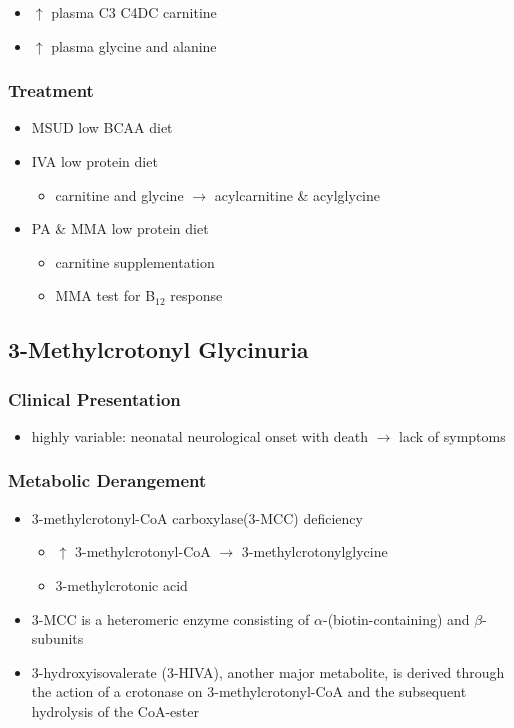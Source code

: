 \documentclass{scrartcl}
\begin{document}
\begin{enumerate}
\begin{itemize}
\item \(\uparrow\) plasma C3 \textpm{} C4DC carnitine
\item \(\uparrow\) plasma glycine and alanine
\end{itemize}
\end{enumerate}

\subsubsection{Treatment}
\label{sec:org5c84bac}
\begin{itemize}
\item MSUD low BCAA diet
\item IVA low protein diet
\begin{itemize}
\item carnitine and glycine \(\to\) acylcarnitine \& acylglycine
\end{itemize}
\item PA \& MMA low protein diet
\begin{itemize}
\item carnitine supplementation
\item MMA test for B\(_{\text{12}}\) response
\end{itemize}
\end{itemize}

\subsection{3-Methylcrotonyl Glycinuria}
\label{sec:org94d12bd}
\subsubsection{Clinical Presentation}
\label{sec:orgc234502}
\begin{itemize}
\item highly variable: neonatal neurological onset with death \(\to\) lack of symptoms
\end{itemize}
\subsubsection{Metabolic Derangement}
\label{sec:org272b7d0}
\begin{itemize}
\item 3-methylcrotonyl-CoA carboxylase(3-MCC) deficiency
\begin{itemize}
\item \(\uparrow\) 3-methylcrotonyl-CoA \(\to\) 3-methylcrotonylglycine
\item 3-methylcrotonic acid
\end{itemize}
\item 3-MCC is a heteromeric enzyme consisting of
\(\alpha\)-(biotin-containing) and \(\beta\)-subunits
\item 3-hydroxyisovalerate (3-HIVA), another major metabolite, is derived
through the action of a crotonase on 3-methylcrotonyl-CoA and the
subsequent hydrolysis of the CoA-ester
\end{itemize}
\end{document}
